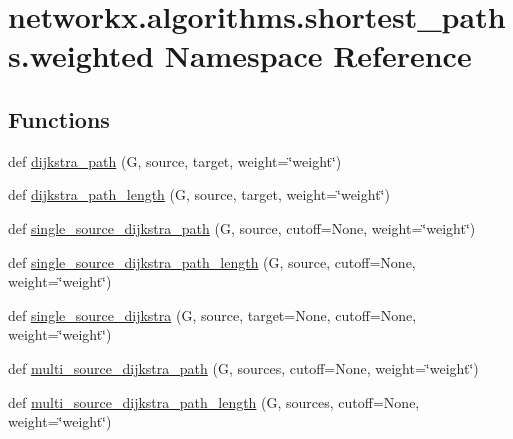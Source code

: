 \hypertarget{namespacenetworkx_1_1algorithms_1_1shortest__paths_1_1weighted}{}\section{networkx.\+algorithms.\+shortest\+\_\+paths.\+weighted Namespace Reference}
\label{namespacenetworkx_1_1algorithms_1_1shortest__paths_1_1weighted}
\subsection*{Functions}
\begin{DoxyCompactItemize}
\item 
def \hyperlink{namespacenetworkx_1_1algorithms_1_1shortest__paths_1_1weighted_a095dd1ac8fbd1166cdfec7a044b2a751}{dijkstra\+\_\+path} (G, source, target, weight=\char`\"{}weight\char`\"{})
\item 
def \hyperlink{namespacenetworkx_1_1algorithms_1_1shortest__paths_1_1weighted_a01a179e91d8496dabf25682da89b575b}{dijkstra\+\_\+path\+\_\+length} (G, source, target, weight=\char`\"{}weight\char`\"{})
\item 
def \hyperlink{namespacenetworkx_1_1algorithms_1_1shortest__paths_1_1weighted_a9fce3a81151f15473e1801803a3a1028}{single\+\_\+source\+\_\+dijkstra\+\_\+path} (G, source, cutoff=None, weight=\char`\"{}weight\char`\"{})
\item 
def \hyperlink{namespacenetworkx_1_1algorithms_1_1shortest__paths_1_1weighted_afec7f3d75b6973e3acc5019448258df7}{single\+\_\+source\+\_\+dijkstra\+\_\+path\+\_\+length} (G, source, cutoff=None, weight=\char`\"{}weight\char`\"{})
\item 
def \hyperlink{namespacenetworkx_1_1algorithms_1_1shortest__paths_1_1weighted_aefc651b4331fd0b95cac56fc491a0e81}{single\+\_\+source\+\_\+dijkstra} (G, source, target=None, cutoff=None, weight=\char`\"{}weight\char`\"{})
\item 
def \hyperlink{namespacenetworkx_1_1algorithms_1_1shortest__paths_1_1weighted_a486bcb57503a86eea5888b1ce4ba8a3d}{multi\+\_\+source\+\_\+dijkstra\+\_\+path} (G, sources, cutoff=None, weight=\char`\"{}weight\char`\"{})
\item 
def \hyperlink{namespacenetworkx_1_1algorithms_1_1shortest__paths_1_1weighted_af0469ea487b81adb0071ccaef986efb4}{multi\+\_\+source\+\_\+dijkstra\+\_\+path\+\_\+length} (G, sources, cutoff=None, weight=\char`\"{}weight\char`\"{})
\item 

\end{DoxyCompactItemize}
